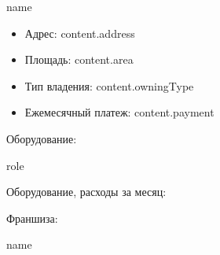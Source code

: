 \documentclass[a4paper,12pt]{article}
\begin{document}
{{{{{{{{{{{{{{{%
  {%
    {{ name }}

    \begin{itemize}
    \item Адрес: {{ content.address }}
    \item Площадь: {{ content.area }}
    \item Тип владения: {{ content.owningType }}
    \item Ежемесячный платеж: {{ content.payment }}
    \end{itemize}
    {%
    Оборудование:
    {%
    {%
      {%
      {{ role }}
        {%
        {%
      {%
    {%

    {%
    Оборудование, расходы за месяц:

    {%
    {%
    {%
      {%
      {%
        {%
      {%
        {%
      {%
    {%
    {%
  {%
{%

{%
Франшиза:
  {%
      {{ name }}

}}}}}}}}}}}}}}}}}}}}}}}}}}}}}}}}}}}}}}}}
\end{document}
